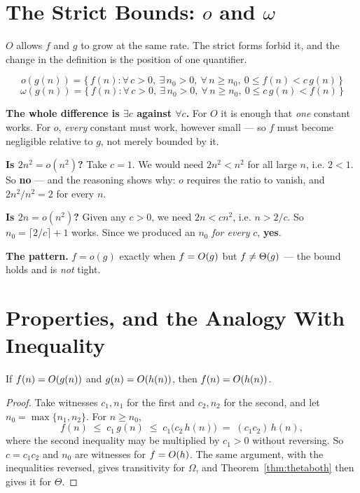 \section{The Strict Bounds: \texorpdfstring{$o$ and $\omega$}{o and omega}}

$O$ allows $f$ and $g$ to grow at the same rate. The strict forms forbid it,
and the change in the definition is the position of one quantifier.

\begin{definitionbox}
\[ o(g(n)) = \bigl\{\, f(n) :
   \forall\, c > 0,\ \exists\, n_{0} > 0,\
   \forall\, n \ge n_{0},\ 0 \le f(n) < c\,g(n) \,\bigr\} \]
\[ \omega(g(n)) = \bigl\{\, f(n) :
   \forall\, c > 0,\ \exists\, n_{0} > 0,\
   \forall\, n \ge n_{0},\ 0 \le c\,g(n) < f(n) \,\bigr\} \]

\smallskip
\textbf{The whole difference is $\exists c$ against $\forall c$.} For $O$ it is
enough that \emph{one} constant works. For $o$, \emph{every} constant must
work, however small --- so $f$ must become negligible relative to $g$, not
merely bounded by it.
\end{definitionbox}

\begin{worked}
\textbf{Is $2n^{2} = o(n^{2})$?} Take $c = 1$. We would need $2n^{2} < n^{2}$
for all large $n$, i.e. $2 < 1$. So \textbf{no} --- and the reasoning shows why:
$o$ requires the ratio to vanish, and $2n^{2}/n^{2} = 2$ for every $n$.

\smallskip
\textbf{Is $2n = o(n^{2})$?} Given any $c > 0$, we need $2n < cn^{2}$, i.e.
$n > 2/c$. So $n_{0} = \lceil 2/c \rceil + 1$ works. Since we produced an
$n_{0}$ \emph{for every} $c$, \textbf{yes}.

\smallskip
\textbf{The pattern.} $f = o(g)$ exactly when $f = O(g)$ but
$f \ne \Theta(g)$ --- the bound holds and is \emph{not} tight.
\end{worked}

\section{Properties, and the Analogy With Inequality}

\begin{theorem}[Transitivity]\label{thm:trans}
If $f(n) = O(g(n))$ and $g(n) = O(h(n))$, then
$f(n) = O(h(n))$.
\end{theorem}

\begin{proof}
Take witnesses $c_{1}, n_{1}$ for the first and $c_{2}, n_{2}$ for the second,
and let $n_{0} = \max\{n_{1}, n_{2}\}$. For $n \ge n_{0}$,
\[ f(n) \;\le\; c_{1}\,g(n) \;\le\; c_{1}\bigl(c_{2}\,h(n)\bigr)
   \;=\; (c_{1}c_{2})\,h(n), \]
where the second inequality may be multiplied by $c_{1} > 0$ without reversing.
So $c = c_{1}c_{2}$ and $n_{0}$ are witnesses for $f = O(h)$. The same
argument, with the inequalities reversed, gives transitivity for $\Omega$, and
Theorem~\ref{thm:thetaboth} then gives it for $\Theta$.
\end{proof}

